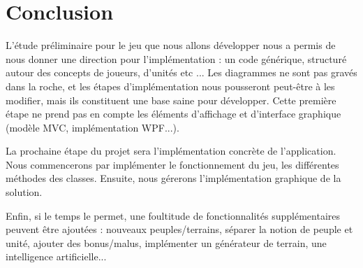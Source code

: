 \section{Conclusion}

L'étude préliminaire pour le jeu que nous allons développer nous a permis de nous donner une direction pour l'implémentation : un code générique, structuré autour des concepts de joueurs, d'unités etc ... Les diagrammes ne sont pas gravés dans la roche, et les étapes d'implémentation nous pousseront peut-être à les modifier, mais ils constituent une base saine pour développer.
Cette première étape ne prend pas en compte les éléments d'affichage et d'interface graphique (modèle MVC, implémentation WPF...).

La prochaine étape du projet sera l'implémentation concrète de l'application. Nous commencerons par implémenter le fonctionnement du jeu, les différentes méthodes des classes. Ensuite, nous gérerons l'implémentation graphique de la solution.

Enfin, si le temps le permet, une foultitude de fonctionnalités supplémentaires peuvent être ajoutées : nouveaux peuples/terrains, séparer la notion de peuple et unité, ajouter des bonus/malus, implémenter un générateur de terrain, une intelligence artificielle...